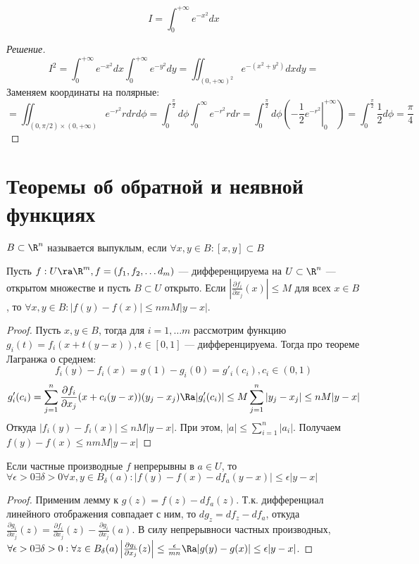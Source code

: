 \begin{example}
    \[I = \int_0^{+\infty} e^{-x^2}dx\]
\end{example}
\begin{proof}[Решение]
    \[I^2 = \int_0^{+\infty} e^{-x^2}dx \int_0^{+\infty} e^{-y^2}dy = \iint_{(0, +\infty)^2} e^{-(x^2+y^2)}dxdy = \]
    Заменяем координаты на полярные:
    \[= \iint_{(0, \pi/2) \times (0, +\infty)} e^{-r^2}rdrd\phi = \int_0^{\frac{\pi}{2}}d\phi \int_0^\infty e^{-r^2}rdr = \int_0^{\frac{\pi}{2}}d\phi \left(\left.-\frac{1}{2}e^{-r^2}\right|_0^{+\infty}\right) = \int_0^{\frac{\pi}{2}} \frac{1}{2} d\phi = \frac{\pi}{4}\]
\end{proof}

\section{Теоремы об обратной и неявной функциях}
\begin{definition}
    \(B \subset \R^n\) называется выпуклым, если \(\forall x, y \in B: [x, y] \subset B\)
\end{definition}

\begin{lemma}
    Пусть \(f: U \ra \R^m, f = (f_1, f_2, \dots d_m)\) --- дифференцируема на \(U \subset \R^n\) --- открытом множестве и пусть \(B \subset U\) открыто. Если \(\left| \frac{\partial f_i}{\partial x_j}(x) \right| \le M\) для всех \(x \in B\), то \(\forall x, y \in B: |f(y) - f(x)| \le nmM|y - x|\).
\end{lemma}
\begin{proof}
    Пусть \(x, y \in B\), тогда для \(i = 1, \dots m\) рассмотрим функцию \(g_i(t) = f_i(x + t(y - x)), t \in [0, 1]\) --- дифференцируема. Тогда про теореме Лагранжа о среднем:
    \[f_i(y) - f_i(x) = g(1) - g_i(0) = g'_i(c_i), c_i \in (0, 1)\]
    \[g_i'(c_i) = \sum_{j = 1}^n \frac{\partial f_i}{\partial x_j}(x + c_i(y - x))(y_j - x_j) \Ra |g_i'(c_i)| \le M\sum_{j = 1}^n |y_j - x_j| \le nM|y - x|\]
    Откуда \(|f_i(y) - f_i(x)| \le nM|y - x|\). При этом, \(|a| \le \sum_{i = 1}^n |a_i|\). Получаем \(f(y) - f(x) \le nmM|y - x|\)
\end{proof}

\begin{corollary}
    Если частные производные \(f\) непрерывны в \(a \in U\), то \(\forall \epsilon > 0 \exists \delta > 0 \forall x, y \in B_\delta(a): |f(y) - f(x) - df_a(y - x)| \le \epsilon|y - x|\)
\end{corollary}
\begin{proof}
    Применим лемму к \(g(z) = f(z) - df_a(z)\). Т.к. дифференциал линейного отображения совпадает с ним, то \(dg_z = df_z - df_a\), откуда \(\frac{\partial g_i}{\partial x_j}(z) = \frac{\partial f_i}{\partial x_j}(z) - \frac{\partial g_i}{\partial x_j}(a)\). В силу непрерывноси частных производных, \(\forall \epsilon > 0 \exists \delta > 0: \forall z \in B_\delta(a) \left| \frac{\partial g_i}{\partial x_j}(z) \right| \le \frac{\epsilon}{mn} \Ra |g(y) - g(x)| \le \epsilon|y - x|\).
\end{proof}

